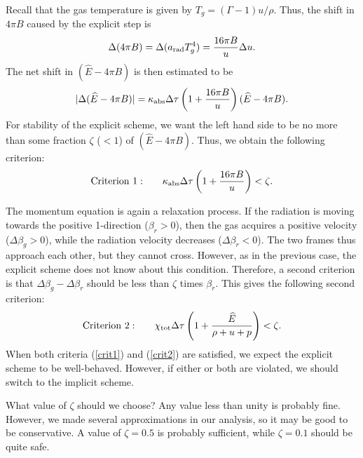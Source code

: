 \documentclass[12pt,preprint]{aastex}
\begin{document}
Recall that the gas temperature is given by $T_g
=(\Gamma-1)u/\rho$. Thus, the shift in $4\pi B$ caused by the explicit
step is
\begin{equation}
\Delta(4\pi B) = \Delta(a_{\rm rad}T_g^4) =  \frac{16\pi B}{u} \Delta u.
\end{equation}
The net shift in $(\widehat{E}-4\pi B)$ is then estimated to be
\begin{equation}
|\Delta(\widehat{E}-4\pi B)| = \kappa_{\rm abs}\Delta\tau\left(1+
\frac{16\pi B}{u}\right)(\widehat{E}-4\pi B).
\end{equation}
For stability of the explicit scheme, we want the left hand side to be
no more than some fraction $\zeta$ ($<1$) of $(\widehat{E}-4\pi
B)$. Thus, we obtain the following criterion:
\begin{equation}
{\rm Criterion~1:}\qquad
\kappa_{\rm abs}\Delta\tau\left(1+ \frac{16\pi B}{u}\right) < \zeta.
\label{crit1}
\end{equation}

The momentum equation is again a relaxation process.  If the radiation
is moving towards the positive 1-direction ($\beta_r>0$), then the gas
acquires a positive velocity ($\Delta\beta_g>0$), while the radiation
velocity decreases ($\Delta\beta_r <0$). The two frames thus approach
each other, but they cannot cross. However, as in the previous case,
the explicit scheme does not know about this condition.  Therefore, a
second criterion is that $\Delta\beta_g-\Delta\beta_r$ should be less
than $\zeta$ times $\beta_r$. This gives the following second
criterion:
\begin{equation}
{\rm Criterion~2:}\qquad
\chi_{\rm tot}\Delta\tau\left(1+ \frac{\widehat{E}}{\rho+u+p}\right) < \zeta.
\label{crit2}
\end{equation}
When both criteria (\ref{crit1}) and (\ref{crit2}) are satisfied, we
expect the explicit scheme to be well-behaved. However, if either or
both are violated, we should switch to the implicit scheme.

What value of $\zeta$ should we choose? Any value less than unity is
probably fine. However, we made several approximations in our
analysis, so it may be good to be conservative.  A value of
$\zeta=0.5$ is probably sufficient, while $\zeta=0.1$ should be quite
safe.
\end{document}
